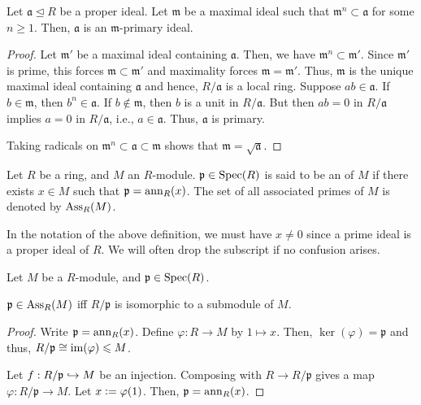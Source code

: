\begin{prop}
	Let $\mathfrak{a} \unlhd R$ be a proper ideal. Let $\mathfrak{m}$ be a maximal ideal such that $\mathfrak{m}^{n} \subset \mathfrak{a}$ for some $n \ge 1$. Then, $\mathfrak{a}$ is an $\mathfrak{m}$-primary ideal.
\end{prop}
\begin{proof} 
	Let $\mathfrak{m}'$ be a maximal ideal containing $\mathfrak{a}$. Then, we have $\mathfrak{m}^{n} \subset \mathfrak{m}'$. Since $\mathfrak{m}'$ is prime, this forces $\mathfrak{m} \subset \mathfrak{m}'$ and maximality forces $\mathfrak{m} = \mathfrak{m}'$. Thus, $\mathfrak{m}$ is the unique maximal ideal containing $\mathfrak{a}$ and hence, $R/\mathfrak{a}$ is a local ring. Suppose $ab \in \mathfrak{a}$. If $b \in \mathfrak{m}$, then $b^{n} \in \mathfrak{a}$. If $b \notin \mathfrak{m}$, then $b$ is a unit in $R/\mathfrak{a}$. But then $ab = 0$ in $R/\mathfrak{a}$ implies $a = 0$ in $R/\mathfrak{a}$, i.e., $a \in \mathfrak{a}$. Thus, $\mathfrak{a}$ is primary.

	Taking radicals on $\mathfrak{m}^{n} \subset \mathfrak{a} \subset \mathfrak{m}$ shows that $\mathfrak{m} = \sqrt{\mathfrak{a}}$.
\end{proof}

\begin{defn}
	Let $R$ be a ring, and $M$ an $R$-module. $\mathfrak{p} \in \operatorname{Spec}(R)$ is said to be an  of $M$ if there exists $x \in M$ such that $\mathfrak{p} = \operatorname{ann}_{R}(x)$. The set of all associated primes of $M$ is denoted by $\operatorname{Ass}_{R}(M)$.
\end{defn}
In the notation of the above definition, we must have $x \neq 0$ since a prime ideal is a proper ideal of $R$. We will often drop the subscript if no confusion arises.

\begin{prop} \label{prop:associated-quotient-embeds}
	Let $M$ be a $R$-module, and $\mathfrak{p} \in \operatorname{Spec}(R)$. 

	$\mathfrak{p} \in \operatorname{Ass}_{R}(M)$ iff $R/\mathfrak{p}$ is isomorphic to a submodule of $M$.
\end{prop}
\begin{proof} 
	\forward Write $\mathfrak{p} = \operatorname{ann}_{R}(x)$. Define $\varphi : R \to M$ by $1 \mapsto x$. Then, $\ker(\varphi) = \mathfrak{p}$ and thus, $R/\mathfrak{p} \cong \operatorname{im}(\varphi) \leqslant M$. 

	\backward Let $f : R/\mathfrak{p} \hookrightarrow M$ be an injection. Composing with $R \to R/\mathfrak{p}$ gives a map $\varphi : R/\mathfrak{p} \to M$. Let $x \vcentcolon= \varphi(1)$. Then, $\mathfrak{p} = \operatorname{ann}_{R}(x)$.
\end{proof}

